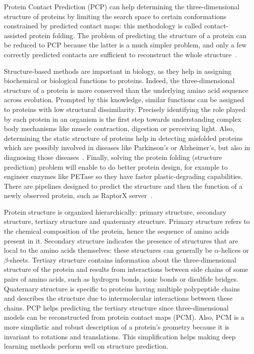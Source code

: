     Protein Contact Prediction (PCP) can help determining the three-dimensional structure of proteins by limiting the search space to certain conformations
    constrained by predicted contact maps: this methodology is called contact-assisted protein folding.
    The problem of predicting the structure of a protein can be reduced to PCP because the latter is a much simpler problem,
    and only a few correctly predicted contacts are sufficient to reconstruct the whole structure~\cite{kim2014one}.

    Structure-based methods are important in biology,
    as they help in assigning biochemical or biological functions to proteins. Indeed, the three-dimensional
    structure of a protein is more conserved than the underlying amino acid sequence across evolution. Prompted by this knowledge, similar functions
    can be assigned to proteins with low structural dissimilarity. Precisely identifying the role played by each protein in an organism is the first step
    towards understanding complex body mechanisms like muscle contraction, digestion or perceiving light.
    Also, determining the static structure of proteins help in detecting misfolded proteins which are possibly involved in diseases like Parkinson's or
    Alzheimer's, but also in diagnosing those diseases~\cite{forloni2002protein}.
    Finally, solving the protein folding (structure prediction) problem will enable to do better protein design, for example to engineer enzymes like PETase
    so they have faster plastic-degrading capabilities.
    There are pipelines designed to predict the structure and then the function of a newly
    observed protein, such as RaptorX server~\cite{peng2011raptorx}.

    Protein structure is organized hierarchically: primary structure, secondary structure, tertiary structure
    and quaternary structure. Primary structure refers to the chemical composition of the protein, hence the sequence of amino acids present in it.
    Secondary structure indicates the presence of structures that are local to the amino acids themselves:
    these structures can generally be $\alpha$-helices
    or $\beta$-sheets. Tertiary structure contains information about the three-dimensional structure of the protein and results from interactions
    between side chains of some pairs of amino acids, such as hydrogen bonds, ionic bonds or disulfide bridges.
    Quaternary structure is specific to proteins having multiple polypeptide chains and describes the structure due to intermolecular interactions between
    these chains. PCP helps predicting the tertiary structure since three-dimensional models can be reconstructed from protein contact maps (PCM).
    Also, PCM is a more simplistic and robust description of a protein's geometry because it is invariant to rotations and translations.
    This simplification helps making deep learning methods perform well on structure prediction.

